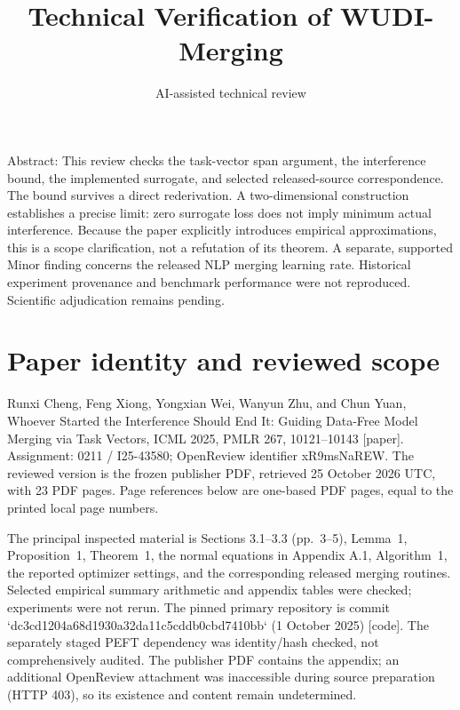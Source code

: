 \documentclass[10pt]{article}
\title{Technical Verification of WUDI-Merging}
\author{AI-assisted technical review}
\date{}
\begin{document}
\maketitle
Abstract: This review checks the task-vector span argument, the interference bound, the implemented surrogate, and selected released-source correspondence. The bound survives a direct rederivation. A two-dimensional construction establishes a precise limit: zero surrogate loss does not imply minimum actual interference. Because the paper explicitly introduces empirical approximations, this is a scope clarification, not a refutation of its theorem. A separate, supported Minor finding concerns the released NLP merging learning rate. Historical experiment provenance and benchmark performance were not reproduced. Scientific adjudication remains pending.\par
\section*{Paper identity and reviewed scope}
Runxi Cheng, Feng Xiong, Yongxian Wei, Wanyun Zhu, and Chun Yuan, Whoever Started the Interference Should End It: Guiding Data-Free Model Merging via Task Vectors, ICML 2025, PMLR 267, 10121–10143 [paper]. Assignment: 0211 / I25-43580; OpenReview identifier xR9msNaREW. The reviewed version is the frozen publisher PDF, retrieved 25 October 2026 UTC, with 23 PDF pages. Page references below are one-based PDF pages, equal to the printed local page numbers.\par
The principal inspected material is Sections 3.1–3.3 (pp. 3–5), Lemma 1, Proposition 1, Theorem 1, the normal equations in Appendix A.1, Algorithm 1, the reported optimizer settings, and the corresponding released merging routines. Selected empirical summary arithmetic and appendix tables were checked; experiments were not rerun. The pinned primary repository is commit `dc3cd1204a68d1930a32da11c5cddb0cbd7410bb` (1 October 2025) [code]. The separately staged PEFT dependency was identity/hash checked, not comprehensively audited. The publisher PDF contains the appendix; an additional OpenReview attachment was inaccessible during source preparation (HTTP 403), so its existence and content remain undetermined.\par
\end{document}

